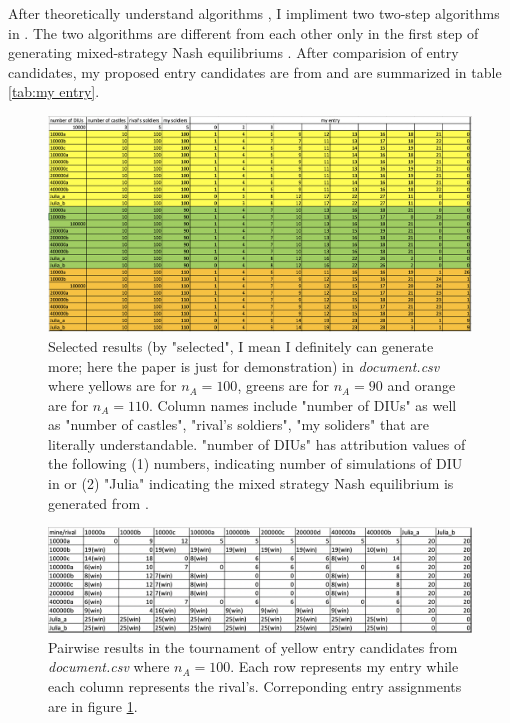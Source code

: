 \documentclass[aos,preprint]{imsart}  %
\numberwithin{table}{section} %
\theoremstyle{plain}
\theoremstyle{plain}
\theoremstyle{TheoremNum}
\newcommand{\1}{{\bf 1}}
\newcommand{\0}{{\vec{\mathbf{0}}}}
\numberwithin{equation}{section}
\begin{document}
After theoretically understand algorithms \citep{ahmadinejad2016duels,behnezhad2017faster,vu2018efficient}, I impliment two two-step algorithms in \citep{behnezhad2017faster,vu2018efficient}. The two algorithms are different from each other only in the first step of  generating mixed-strategy Nash equilibriums \citep{li2018blotto}. After comparision of entry candidates, my proposed entry candidates are from  \citep{behnezhad2017faster} and are summarized in table \ref{tab:my entry}. 
\begin{figure}[ht]
	\caption{Selected results (by "selected", I mean I definitely can generate more; here the paper is just for demonstration) in \textit{document.csv} where yellows are for $n_A=100$, greens are for $n_A=90$ and orange are for $n_A =110$. Column names include "number of DIUs" as well as "number of castles", "rival's soldiers", "my soliders" that are literally understandable. "number of DIUs" has attribution values of the following (1) numbers, indicating number of simulations of DIU in \citep{vu2018efficient} or (2) "Julia" indicating the mixed strategy Nash equilibrium is generated from \cite{behnezhad2017faster}.}
	\label{fig:Results document.csv where yellows are for }
	\begin{center}
\includegraphics[width =\textwidth]{solutions.png}
	\end{center}
	
\end{figure}
\begin{figure}[ht]
	\caption{Pairwise results in the tournament of yellow entry candidates from \textit{document.csv} where $n_A=100$. Each row represents my entry while each column represents the rival's. Correponding entry assignments are in figure \ref{fig:Results document.csv where yellows are for }.}
	\label{fig:output table 100}
	\begin{center}
		\includegraphics[width =\textwidth]{output_table_100.png}
	\end{center}
	
\end{figure}
\end{document}
